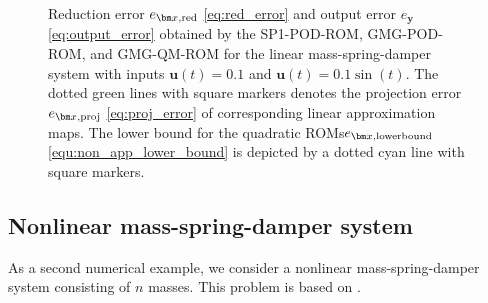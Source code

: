 \documentclass{article}
\newcommand{\statex}{{\bm x}}
\newcommand{\outputy}{{\bm y}}
\newcommand{\inputu}{\bm{u}}
\newcommand{\FOMsizeHalf}{n}
\newcommand{\GMG}{\textsf{GMG}\xspace}
\newcommand{\QM}{\textsf{QM}\xspace} %
\newcommand{\POD}{\textsf{POD}\xspace}
\newcommand{\ROM}{\textsf{ROM}\xspace}
\newcommand{\ROMs}{\textsf{ROM}s\xspace}
\newcommand{\SPLin}{\textsf{SP1}\xspace}
\begin{document}
\begin{figure}[htbp]
	\caption{Reduction error $e_{\statex, {\rm red}}$ \eqref{eq:red_error} and output error $e_{\outputy}$ \eqref{eq:output_error} obtained by the \SPLin-\POD-\ROM,  \GMG-\POD-\ROM, and \GMG-\QM-\ROM for the linear mass-spring-damper system with inputs $\inputu(t) = 0.1$ and $\inputu(t)=0.1\sin(t)$. The dotted green lines with square markers denotes the projection error $e_{\statex, {\rm proj}}$ \eqref{eq:proj_error} of corresponding linear approximation maps. The lower bound for the quadratic \ROMs $e_{\statex,{\rm lowerbound}}$ \eqref{equ:non_app_lower_bound} is depicted by a dotted cyan line with square markers.
	}
	\label{fig:MSD_time}
\end{figure}	

\subsection{Nonlinear mass-spring-damper system}
\label{subsec:Num_nonlinear_MSD}

As a second numerical example, we consider a nonlinear mass-spring-damper system consisting of $\FOMsizeHalf$ masses. This problem is based on \cite[Section 5.2.2]{annoni2016modeling}.
\end{document}
